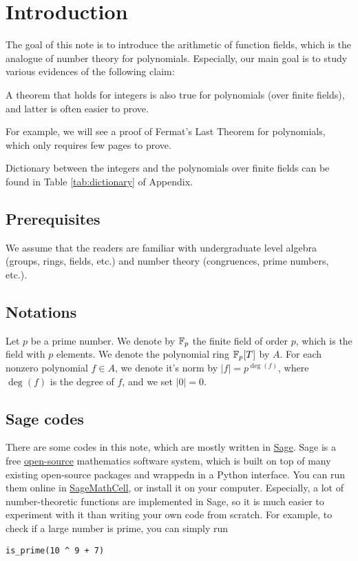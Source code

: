 \section{Introduction}
\label{sec:intro}

The goal of this note is to introduce the arithmetic of function fields, which is the analogue of number theory for polynomials.
Especially, our main goal is to study various evidences of the following claim:

\begin{myquote}
A theorem that holds for integers is also true for polynomials (over finite fields), and latter is often easier to prove.
\end{myquote}
For example, we will see a proof of Fermat's Last Theorem for polynomials, which only requires few pages to prove.

Dictionary between the integers and the polynomials over finite fields can be found in Table \ref{tab:dictionary} of Appendix.

\subsection*{Prerequisites}
We assume that the readers are familiar with undergraduate level algebra (groups, rings, fields, etc.) and number theory (congruences, prime numbers, etc.).

\subsection*{Notations}

Let $p$ be a prime number. We denote by $\mathbb{F}_p$ the finite field of order $p$, which is the field with $p$ elements.
We denote the polynomial ring $\mathbb{F}_p[T]$ by $A$.
For each nonzero polynomial $f \in A$, we denote it's norm by $|f| = p^{\deg (f)}$, where $\deg (f)$ is the degree of $f$, and we set $|0| = 0$.

\subsection*{Sage codes}

There are some codes in this note, which are mostly written in \href{https://www.sagemath.org/}{Sage}.
Sage is a free \href{https://github.com/sagemath/sage}{open-source} mathematics software system, which is built on top of many existing open-source packages and wrappedn in a Python interface.
You can run them online in \href{https://sagecell.sagemath.org/}{SageMathCell}, or install it on your computer.
Especially, a lot of number-theoretic functions are implemented in Sage, so it is much easier to experiment with it than writing your own code from scratch.
For example, to check if a large number is prime, you can simply run
\begin{verbatim}
is_prime(10 ^ 9 + 7)
\end{verbatim}



